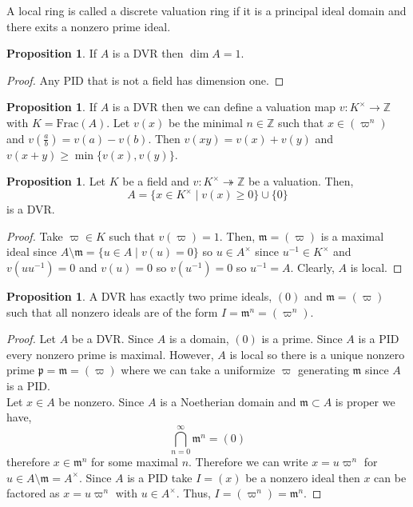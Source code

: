 \documentclass[12pt]{article}
\newcommand{\Z}{\mathbb{Z}}
\newcommand{\Frac}[1]{\mathrm{Frac}\left(#1\right)}
\newcommand{\p}{\mathfrak{p}}
\newcommand{\m}{\mathfrak{m}}
\theoremstyle{remark}
\theoremstyle{definition}
\newtheorem{proposition}[theorem]{Proposition}
\newenvironment{definition}[1][Definition:]{\begin{trivlist}
\item[\hskip \labelsep {\bfseries #1}]}{\end{trivlist}}
\begin{document}
\begin{definition}
A local ring is called a discrete valuation ring if it is a principal ideal domain and there exits a nonzero prime ideal.
\end{definition}

\begin{proposition}
If $A$ is a DVR then $\dim{A} = 1$.
\end{proposition}

\begin{proof}
Any PID that is not a field has dimension one.
\end{proof}

\begin{proposition}
If $A$ is a DVR then we can define a valuation map $v : K^\times \to \Z$ with $K = \Frac{A}$. Let $v(x)$ be the minimal $n \in \Z$ such that $x \in (\varpi^n)$ and $v(\frac{a}{b}) = v(a) - v(b)$. Then $v(xy) = v(x) + v(y)$ and $v(x + y) \ge \min\{v(x), v(y)\}$. 
\end{proposition}


\begin{proposition}
Let $K$ be a field and $v : K^\times \twoheadrightarrow \Z$ be a valuation. Then,
\[ A = \{ x \in K^\times \mid v(x) \ge 0 \} \cup \{0\} \]
is a DVR.
\end{proposition}

\begin{proof}
Take $\varpi \in K$ such that $v(\varpi) = 1$. Then, $\m = (\varpi)$ is a maximal ideal since $A \setminus \m = \{ u \in A \mid v(u) = 0 \}$ so $u \in A^\times$ since $u^{-1} \in K^\times$ and $v(u u^{-1}) = 0$ and $v(u) = 0$ so $v(u^{-1}) = 0$ so $u^{-1} = A$. Clearly, $A$ is local.
\end{proof}


\begin{proposition}
A DVR has exactly two prime ideals, $(0)$ and $\m = (\varpi)$ such that all nonzero ideals are of the form $I = \m^n = (\varpi^n)$. 
\end{proposition}

\begin{proof}
Let $A$ be a DVR. Since $A$ is a domain, $(0)$ is a prime. Since $A$ is a PID every nonzero prime is maximal. However, $A$ is local so there is a unique nonzero prime $\p = \m = (\varpi)$ where we can take a uniformize $\varpi$ generating $\m$ since $A$ is a PID.
\bigskip\\
Let $x \in A$ be nonzero. Since $A$ is a Noetherian domain and $\m \subset A$ is proper we have,
\[ \bigcap_{n = 0}^\infty \m^n = (0) \]
therefore $x \in \m^n$ for some maximal $n$. Therefore we can write $x = u \varpi^n$ for $u \in A \setminus \m = A^\times$.
Since $A$ is a PID take $I = (x)$ be a nonzero ideal then $x$ can be factored as $x = u \varpi^n$ with $u \in A^\times$. Thus, $I = (\varpi^n) = \m^n$. 
\end{proof}
\end{document}
